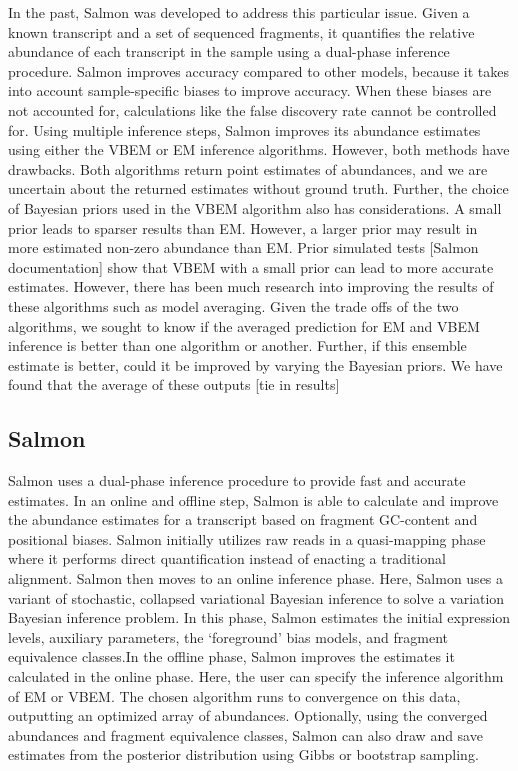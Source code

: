 In the past, Salmon was developed to address this particular issue. 
Given a known transcript and a set of sequenced fragments, it quantifies the relative abundance of each transcript in the sample using a dual-phase inference procedure. Salmon improves accuracy compared to other models, because it takes into account sample-specific biases to improve accuracy. When these biases are not accounted for, calculations like the false discovery rate cannot be controlled for. Using multiple inference steps, Salmon improves its abundance estimates using either the VBEM or EM inference algorithms. However, both methods have drawbacks. Both algorithms return point estimates of abundances, and we are uncertain about the returned estimates without ground truth. Further, the choice of  Bayesian priors used in the VBEM algorithm also has considerations. A small prior leads to sparser results than EM. However, a larger prior may result in more estimated non-zero abundance than EM. Prior simulated tests [Salmon documentation] show that VBEM with a small prior can lead to more accurate estimates. However, there has been much research into improving the results of these algorithms such as model averaging. \cite{doi:10.1177/2515245919898657}\cite{11c48783-68bb-36b7-8053-175211b0eaa8}\cite{hoeting_bayesian_1999} Given the trade offs of the two algorithms, we sought to know if the averaged prediction for EM and VBEM inference is better than one algorithm or another. Further, if this ensemble estimate is better, could it be improved by varying the Bayesian priors.
We have found that the average of these outputs [tie in results]

\subsection{Salmon}
Salmon uses a dual-phase inference procedure to provide fast and accurate estimates. 
In an online and offline step, Salmon is able to calculate and improve the abundance 
estimates for a transcript based on fragment GC-content and positional biases. 
Salmon initially utilizes raw reads in a quasi-mapping phase where it performs direct 
quantification instead of enacting a traditional alignment. 
Salmon then moves to an online inference phase. 
Here, Salmon uses a variant of stochastic, collapsed variational Bayesian inference to solve 
a variation Bayesian inference problem. 
In this phase, Salmon estimates the initial expression levels, auxiliary parameters, 
the ‘foreground’ bias models, and fragment equivalence classes.In the offline phase, 
Salmon improves the estimates it calculated in the online phase. Here, the user can 
specify the inference algorithm of EM or VBEM. The chosen algorithm runs to convergence 
on this data, outputting an optimized array of abundances. 
Optionally, using the converged abundances and fragment equivalence classes, 
Salmon can also draw and save estimates from the posterior distribution using Gibbs or bootstrap sampling. 
